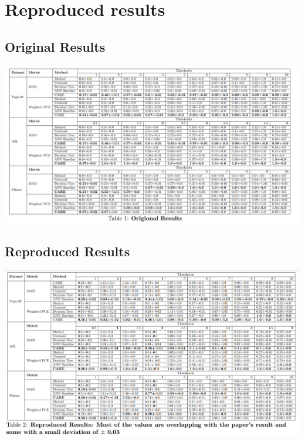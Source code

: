 \section{Reproduced results}

\subsection{Original Results}
\includegraphics[width=\textwidth]{Images/imgage2.png}
\subsection{Reproduced Results}
\includegraphics[width=\textwidth]{Images/image3.png}
